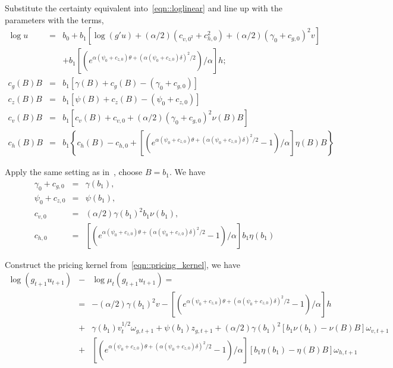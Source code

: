 \documentclass[11pt,reqno,final]{amsart}
\begin{document}
Substitute the certainty equivalent into~\ref{eqn::loglinear} and line up with the parameters with the terms,
\begin{eqnarray*}
\log u &=& b_0 + b_1 [\log(g'u)+(\alpha/2)(c_{v,0^2} + c_{h,0}^2)+(\alpha/2)(\gamma_0+c_{g,0})^2v] \\
& & + b_1[(e^{\alpha(\psi_0+c_{z,0})\theta + (\alpha(\psi_0+c_{z,0})\delta)^2/2})/\alpha]h; \\
c_g(B)B &=& b_1 [\gamma(B)+c_g(B)-(\gamma_0+c_{g,0})] \\
c_z(B)B &=& b_1 [\psi(B)+c_z(B)-(\psi_0+c_{z,0})] \\
c_v(B)B &=& b_1 [c_v(B)+c_{v,0}+(\alpha/2)(\gamma_0+c_{g,0})^2 \nu(B)B] \\
c_h(B)B &=& b_1\left\{c_h(B)-c_{h,0}+[(e^{\alpha(\psi_0+c_{z,0})\theta+ (\alpha(\psi_0+c_{z,0})\delta)^2/2}-1)/\alpha]\eta(B)B\right\}
\end{eqnarray*}

Apply the same setting as in~\cite{BCZ14}, choose $B = b_1$. We have
\begin{eqnarray*}
\gamma_0 + c_{g,0} &=& \gamma(b_1), \\
\psi_0 + c_{z,0} &=& \psi(b_1), \\
c_{v,0} &=& (\alpha/2)\gamma(b_1)^2 b_1\nu(b_1), \\
c_{h,0} &=& [(e^{\alpha(\psi_0+c_{z,0})\theta+(\alpha(\psi_0+c_{z,0})\delta)^2/2}-1)/\alpha]b_1 \eta(b_1)
\end{eqnarray*}

Construct the pricing kernel from~\ref{eqn::pricing_kernel}, we have
\begin{eqnarray*}
\log (g_{t+1}u_{t+1}) &-& \log \mu_t(g_{t+1}u_{t+1}) = \\
    &=& -(\alpha/2)\gamma(b_1)^2 v - [(e^{\alpha(\psi_0+c_{z,0})\theta+(\alpha(\psi_0+c_{z,0})\delta)^2/2}-1)/\alpha]h \\
    &+& \gamma(b_1)v_t^{1/2}\omega_{g,t+1} + \psi(b_1) z_{g,t+1} + (\alpha/2)\gamma(b_1)^2[b_1\nu(b_1)-\nu(B)B]\omega_{v,t+1} \\
    &+& [(e^{\alpha(\psi_0+c_{z,0})\theta+(\alpha(\psi_0+c_{z,0})\delta)^2/2}-1)/\alpha] [b_1\eta(b_1)-\eta(B)B]\omega_{h,t+1}
\end{eqnarray*}
\end{document}
